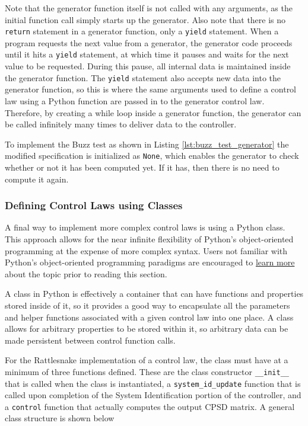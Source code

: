 \documentclass[pdf,12pt,report]{SANDreport}
\newcommand{\inlineCode}{\lstinline[basicstyle=\bfseries\ttfamily]}
\begin{document}
    Note that the generator function itself is not called with any arguments, as the initial function call simply starts up the generator.  Also note that there is no \inlineCode{return} statement in a generator function, only a \inlineCode{yield} statement.   When a program requests the next value from a generator, the generator code proceeds until it hits a \inlineCode{yield} statement, at which time it pauses and waits for the next value to be requested.  During this pause, all internal data is maintained inside the generator function.  The \inlineCode{yield} statement also accepts new data into the generator function, so this is where the same arguments used to define a control law using a Python function are passed in to the generator control law.  Therefore, by creating a while loop inside a generator function, the generator can be called infinitely many times to deliver data to the controller.
    
    To implement the Buzz test as shown in Listing \ref{lst:buzz_test_generator} the modified specification is initialized as \inlineCode{None}, which enables the generator to check whether or not it has been computed yet.  If it has, then there is no need to compute it again.
    
    \subsubsection{Defining Control Laws using Classes}
    
    A final way to implement more complex control laws is using a Python class.  This approach allows for the near infinite flexibility of Python's object-oriented programming at the expense of more complex syntax.  Users not familiar with Python's object-oriented programming paradigms are encouraged to \href{https://docs.python.org/3/tutorial/classes.html}{learn more} about the topic prior to reading this section.
    
    A class in Python is effectively a container that can have functions and properties stored inside of it, so it provides a good way to encapsulate all the parameters and helper functions associated with a given control law into one place.  A class allows for arbitrary properties to be stored within it, so arbitrary data can be made persistent between control function calls.
    
    For the Rattlesnake implementation of a control law, the class must have at a minimum of three functions defined.  These are the class constructor \inlineCode{__init__} that is called when the class is instantiated, a \inlineCode{system_id_update} function that is called upon completion of the System Identification portion of the controller, and a \inlineCode{control} function that actually computes the output \ac{CPSD} matrix.  A general class structure is shown below
    
\end{document}
